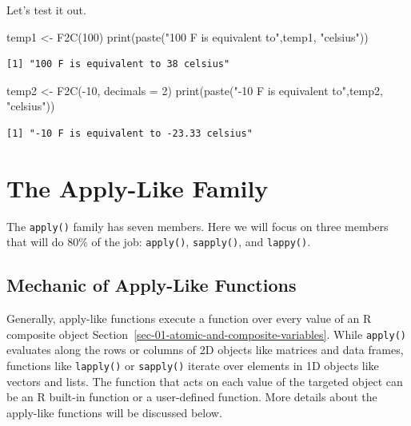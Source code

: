 \documentclass[
  letterpaper,
  DIV=11,
  numbers=noendperiod]{scrreprt}
\newenvironment{Shaded}{\begin{snugshade}}{\end{snugshade}}
\newcommand{\AttributeTok}[1]{\textcolor[rgb]{0.40,0.45,0.13}{#1}}
\newcommand{\DecValTok}[1]{\textcolor[rgb]{0.68,0.00,0.00}{#1}}
\newcommand{\FunctionTok}[1]{\textcolor[rgb]{0.28,0.35,0.67}{#1}}
\newcommand{\NormalTok}[1]{\textcolor[rgb]{0.00,0.23,0.31}{#1}}
\newcommand{\OtherTok}[1]{\textcolor[rgb]{0.00,0.23,0.31}{#1}}
\newcommand{\SpecialCharTok}[1]{\textcolor[rgb]{0.37,0.37,0.37}{#1}}
\newcommand{\StringTok}[1]{\textcolor[rgb]{0.13,0.47,0.30}{#1}}
\begin{document}
Let's test it out.

\begin{Shaded}
\begin{Highlighting}[]
\NormalTok{temp1 }\OtherTok{\textless{}{-}} \FunctionTok{F2C}\NormalTok{(}\DecValTok{100}\NormalTok{)}
\FunctionTok{print}\NormalTok{(}\FunctionTok{paste}\NormalTok{(}\StringTok{"100 F is equivalent to"}\NormalTok{,temp1, }\StringTok{"celsius"}\NormalTok{))}
\end{Highlighting}
\end{Shaded}

\begin{verbatim}
[1] "100 F is equivalent to 38 celsius"
\end{verbatim}

\begin{Shaded}
\begin{Highlighting}[]
\NormalTok{temp2 }\OtherTok{\textless{}{-}} \FunctionTok{F2C}\NormalTok{(}\SpecialCharTok{{-}}\DecValTok{10}\NormalTok{, }\AttributeTok{decimals =} \DecValTok{2}\NormalTok{)}
\FunctionTok{print}\NormalTok{(}\FunctionTok{paste}\NormalTok{(}\StringTok{"{-}10 F is equivalent to"}\NormalTok{,temp2, }\StringTok{"celsius"}\NormalTok{))}
\end{Highlighting}
\end{Shaded}

\begin{verbatim}
[1] "-10 F is equivalent to -23.33 celsius"
\end{verbatim}

\section{The Apply-Like Family}\label{the-apply-like-family}

The \texttt{apply()} family has seven members. Here we will focus on
three members that will do 80\% of the job: \texttt{apply()},
\texttt{sapply()}, and \texttt{lappy()}.

\subsection{Mechanic of Apply-Like
Functions}\label{mechanic-of-apply-like-functions}

Generally, apply-like functions execute a function over every value of
an R composite object
Section~\ref{sec-01-atomic-and-composite-variables}. While
\texttt{apply()} evaluates along the rows or columns of 2D objects like
matrices and data frames, functions like \texttt{lapply()} or
\texttt{sapply()} iterate over elements in 1D objects like vectors and
lists. The function that acts on each value of the targeted object can
be an R built-in function or a user-defined function. More details about
the apply-like functions will be discussed below.
\end{document}
